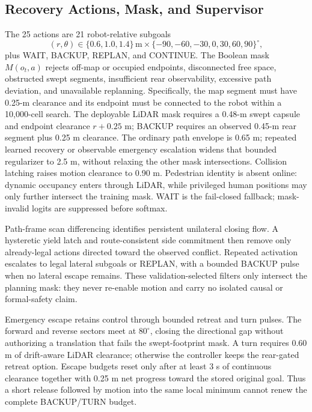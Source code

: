 \subsection{Recovery Actions, Mask, and Supervisor}
The 25 actions are 21 robot-relative subgoals
\begin{equation}
 (r,\theta)\in\{0.6,1.0,1.4\}\,\mathrm{m}
 \times\{-90,-60,-30,0,30,60,90\}^{\circ},
\end{equation}
plus WAIT, BACKUP, REPLAN, and CONTINUE.  The Boolean mask $M(o_t,a)$ rejects
off-map or occupied endpoints, disconnected free space, obstructed swept
segments, insufficient rear observability, excessive path deviation, and
unavailable replanning.  Specifically, the map segment must have 0.25-m
clearance and its endpoint must be connected to the robot within a 10,000-cell
search.  The deployable LiDAR mask requires a 0.48-m swept capsule and endpoint
clearance $r+0.25$ m; BACKUP requires an observed 0.45-m rear segment plus
0.25 m clearance.  The ordinary path envelope is 0.65 m; repeated learned
recovery or observable emergency escalation widens that bounded regularizer to
2.5 m, without relaxing the other mask intersections.  Collision latching
raises motion clearance to 0.90 m.  Pedestrian identity is absent online:
dynamic occupancy enters through LiDAR, while privileged human positions may
only further intersect the training mask.  WAIT is the fail-closed fallback;
mask-invalid logits are suppressed before softmax.

Path-frame scan differencing identifies persistent unilateral closing flow.  A
hysteretic yield latch and route-consistent side commitment then remove only
already-legal actions directed toward the observed conflict.  Repeated
activation escalates to legal lateral subgoals or REPLAN, with a bounded BACKUP
pulse when no lateral escape remains.  These validation-selected filters only
intersect the planning mask: they never re-enable motion and carry no isolated
causal or formal-safety claim.

Emergency escape retains control through bounded retreat and turn pulses.  The
forward and reverse sectors meet at $80^{\circ}$, closing the directional gap
without authorizing a translation that fails the swept-footprint mask.  A turn
requires 0.60 m of drift-aware LiDAR clearance; otherwise the controller keeps
the rear-gated retreat option.  Escape budgets reset only after at least 3 s of
continuous clearance together with 0.25 m net progress toward the stored
original goal.  Thus a short release followed by motion into the same local
minimum cannot renew the complete BACKUP/TURN budget.

